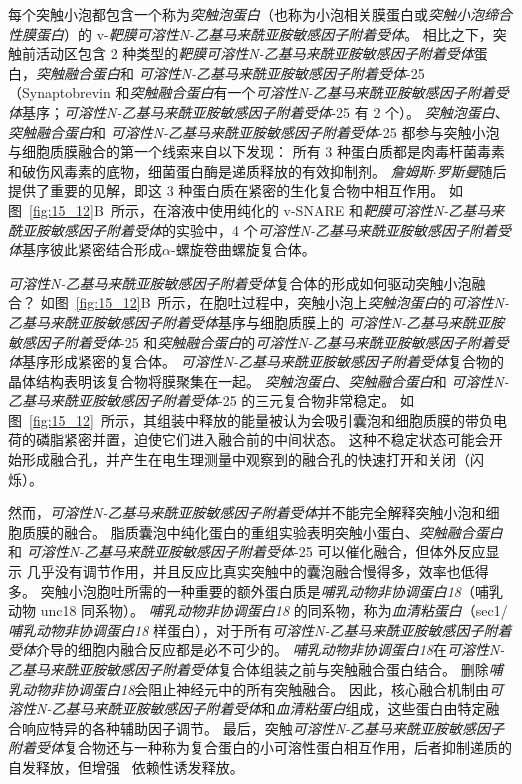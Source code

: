 每个突触小泡都包含一个称为\textit{突触泡蛋白}（也称为小泡相关膜蛋白或\textit{突触小泡缔合性膜蛋白}）的 v-\textit{靶膜可溶性N-乙基马来酰亚胺敏感因子附着受体}。
相比之下，突触前活动区包含 2 种类型的\textit{靶膜可溶性N-乙基马来酰亚胺敏感因子附着受体}蛋白，\textit{突触融合蛋白}和 \textit{可溶性N-乙基马来酰亚胺敏感因子附着受体}-25（Synaptobrevin 和\textit{突触融合蛋白}有一个\textit{可溶性N-乙基马来酰亚胺敏感因子附着受体}基序；\textit{可溶性N-乙基马来酰亚胺敏感因子附着受体}-25 有 2 个）。
\textit{突触泡蛋白}、\textit{突触融合蛋白}和 \textit{可溶性N-乙基马来酰亚胺敏感因子附着受体}-25 都参与突触小泡与细胞质膜融合的第一个线索来自以下发现：
所有 3 种蛋白质都是肉毒杆菌毒素和破伤风毒素的底物，细菌蛋白酶是递质释放的有效抑制剂。
\textit{詹姆斯$\cdot$罗斯曼}随后提供了重要的见解，即这 3 种蛋白质在紧密的生化复合物中相互作用。
如图~\ref{fig:15_12}B~所示，在溶液中使用纯化的 v-SNARE 和\textit{靶膜可溶性N-乙基马来酰亚胺敏感因子附着受体}的实验中，4 个\textit{可溶性N-乙基马来酰亚胺敏感因子附着受体}基序彼此紧密结合形成$\alpha$-螺旋卷曲螺旋复合体。


\textit{可溶性N-乙基马来酰亚胺敏感因子附着受体}复合体的形成如何驱动突触小泡融合？
如图~\ref{fig:15_12}B~所示，在胞吐过程中，突触小泡上\textit{突触泡蛋白}的\textit{可溶性N-乙基马来酰亚胺敏感因子附着受体}基序与细胞质膜上的 \textit{可溶性N-乙基马来酰亚胺敏感因子附着受体}-25 和\textit{突触融合蛋白}的\textit{可溶性N-乙基马来酰亚胺敏感因子附着受体}基序形成紧密的复合体。
\textit{可溶性N-乙基马来酰亚胺敏感因子附着受体}复合物的晶体结构表明该复合物将膜聚集在一起。
\textit{突触泡蛋白}、\textit{突触融合蛋白}和 \textit{可溶性N-乙基马来酰亚胺敏感因子附着受体}-25 的三元复合物非常稳定。
如图~\ref{fig:15_12}~所示，其组装中释放的能量被认为会吸引囊泡和细胞质膜的带负电荷的磷脂紧密并置，迫使它们进入融合前的中间状态。
这种不稳定状态可能会开始形成融合孔，并产生在电生理测量中观察到的融合孔的快速打开和关闭（闪烁）。


然而，\textit{可溶性N-乙基马来酰亚胺敏感因子附着受体}并不能完全解释突触小泡和细胞质膜的融合。
脂质囊泡中纯化蛋白的重组实验表明突触小蛋白、\textit{突触融合蛋白}和 \textit{可溶性N-乙基马来酰亚胺敏感因子附着受体}-25 可以催化融合，但体外反应显示  几乎没有调节作用，并且反应比真实突触中的囊泡融合慢得多，效率也低得多。
突触小泡胞吐所需的一种重要的额外蛋白质是\textit{哺乳动物非协调蛋白18}（哺乳动物 unc18 同系物）。
\textit{哺乳动物非协调蛋白18} 的同系物，称为\textit{血清粘蛋白}（sec1/\textit{哺乳动物非协调蛋白18} 样蛋白），对于所有\textit{可溶性N-乙基马来酰亚胺敏感因子附着受体}介导的细胞内融合反应都是必不可少的。
\textit{哺乳动物非协调蛋白18}在\textit{可溶性N-乙基马来酰亚胺敏感因子附着受体}复合体组装之前与突触融合蛋白结合。
删除\textit{哺乳动物非协调蛋白18}会阻止神经元中的所有突触融合。
因此，核心融合机制由\textit{可溶性N-乙基马来酰亚胺敏感因子附着受体}和\textit{血清粘蛋白}组成，这些蛋白由特定融合响应特异的各种辅助因子调节。
最后，突触\textit{可溶性N-乙基马来酰亚胺敏感因子附着受体}复合物还与一种称为复合蛋白的小可溶性蛋白相互作用，后者抑制递质的自发释放，但增强~ 依赖性诱发释放。


